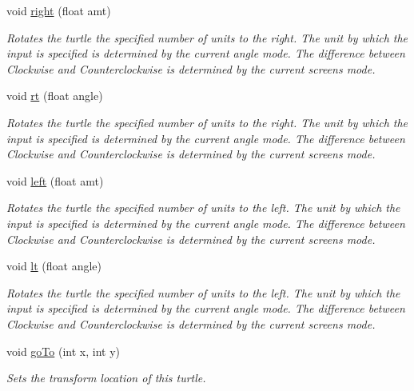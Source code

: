 \begin{DoxyCompactItemize}
void \hyperlink{classcturtle_1_1Turtle_a3586f116fccc417ffa74c115ec3eef54}{right} (float amt)
\begin{DoxyCompactList}\small\item\em Rotates the turtle the specified number of units to the right. The unit by which the input is specified is determined by the current angle mode. The difference between Clockwise and Counterclockwise is determined by the current screen\textquotesingle{}s mode. \end{DoxyCompactList}\item 
void \hyperlink{classcturtle_1_1Turtle_a5416304d65c9bbebe0fabd9914123a79}{rt} (float angle)
\begin{DoxyCompactList}\small\item\em Rotates the turtle the specified number of units to the right. The unit by which the input is specified is determined by the current angle mode. The difference between Clockwise and Counterclockwise is determined by the current screen\textquotesingle{}s mode. \end{DoxyCompactList}\item 
void \hyperlink{classcturtle_1_1Turtle_a60b8d0d7f9a80e4bca57bf3a788a6c01}{left} (float amt)
\begin{DoxyCompactList}\small\item\em Rotates the turtle the specified number of units to the left. The unit by which the input is specified is determined by the current angle mode. The difference between Clockwise and Counterclockwise is determined by the current screen\textquotesingle{}s mode. \end{DoxyCompactList}\item 
void \hyperlink{classcturtle_1_1Turtle_a4858ca94ff49171c615d319a307acb8d}{lt} (float angle)
\begin{DoxyCompactList}\small\item\em Rotates the turtle the specified number of units to the left. The unit by which the input is specified is determined by the current angle mode. The difference between Clockwise and Counterclockwise is determined by the current screen\textquotesingle{}s mode. \end{DoxyCompactList}\item 
\mbox{\label{classcturtle_1_1Turtle_a1ad8303d1ec02fb9d49b88946b73abf7}} 
void \hyperlink{classcturtle_1_1Turtle_a1ad8303d1ec02fb9d49b88946b73abf7}{go\+To} (int x, int y)
\begin{DoxyCompactList}\small\item\em Sets the transform location of this turtle. \end{DoxyCompactList}\item 

\end{DoxyCompactItemize}

